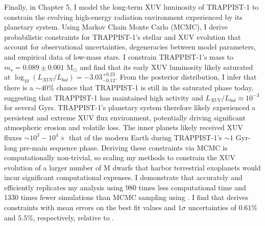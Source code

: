 Finally, in Chapter 5, I model the long-term XUV luminosity of TRAPPIST-1 to constrain the evolving high-energy radiation environment experienced by its planetary system. Using Markov Chain Monte Carlo (MCMC), I derive probabilistic constraints for TRAPPIST-1's stellar and XUV evolution that account for observational uncertainties, degeneracies between model parameters, and empirical data of low-mass stars. I constrain TRAPPIST-1's mass to $m_{\star} = 0.089 \pm{0.001}$ M$_{\odot}$ and find that its early XUV luminosity likely saturated at $\log_{10}(L_{XUV}/L_{bol}) = -3.03^{+0.23}_{-0.12}$. From the posterior distribution, I infer that there is a ${\sim}40\%$ chance that TRAPPIST-1 is still in the saturated phase today, suggesting that TRAPPIST-1 has maintained high activity and $L_{XUV}/L_{bol} \approx 10^{-3}$ for several Gyrs. TRAPPIST-1's planetary system therefore likely experienced a persistent and extreme XUV flux environment, potentially driving significant atmospheric erosion and volatile loss. The inner planets likely received XUV fluxes ${\sim}10^3 - 10^4\times$ that of the modern Earth during TRAPPIST-1's ${\sim}1$ Gyr-long pre-main sequence phase. Deriving these constraints via MCMC is computationally non-trivial, so scaling my methods to constrain the XUV evolution of a larger number of M dwarfs that harbor terrestrial exoplanets would incur significant computational expenses. I demonstrate that \approxposterior accurately and efficiently replicates my analysis using 980 times less computational time and 1330 times fewer simulations than MCMC sampling using \emcee. I find that \approxposterior derives constraints with mean errors on the best fit values and $1\sigma$ uncertainties of $0.61\%$ and $5.5\%$, respectively, relative to \emcee.

